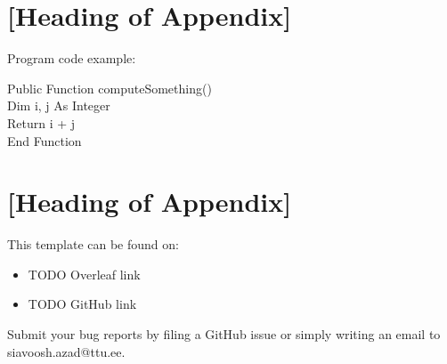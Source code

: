 \documentclass{MasterThesisTUT}
\begin{document}
\begin{appendices}
  \renewcommand{\thesection}{\arabic{section} --}

  \section{[Heading of Appendix]}
  Program code example:

  \begin{algorithm}[!ht]
    Public Function computeSomething() \\
    Dim i, j As Integer\\
    Return i + j\\
    End Function\\
    \label{alg:example}
  \end{algorithm}


  \section{[Heading of Appendix]}
  This template can be found on:
  \begin{itemize}
  \item TODO Overleaf link %
  \item TODO GitHub link %
  \end{itemize}

  Submit your bug reports by filing a GitHub issue or simply writing
  an email to siavoosh.azad@ttu.ee.
\end{appendices}
\end{document}
